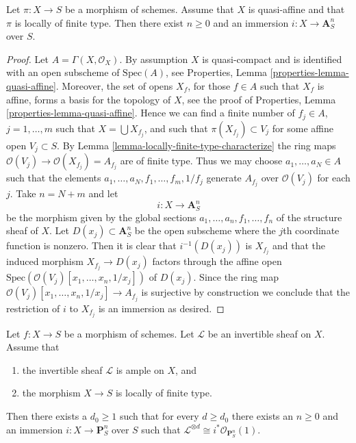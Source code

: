 \begin{lemma}
\label{lemma-quasi-affine-finite-type-over-S}
Let $\pi : X \to S$ be a morphism of schemes.
Assume that $X$ is quasi-affine and that $\pi$ is locally of finite type.
Then there exist $n \geq 0$ and an immersion $i : X \to \mathbf{A}^n_S$
over $S$.
\end{lemma}

\begin{proof}
Let $A = \Gamma(X, \mathcal{O}_X)$. By assumption $X$ is quasi-compact
and is identified with an open subscheme of $\text{Spec}(A)$, see
Properties, Lemma \ref{properties-lemma-quasi-affine}.
Moreover, the set of opens $X_f$, for those $f \in A$ such that $X_f$ is
affine, forms a basis for the topology of $X$, see the proof of
Properties, Lemma \ref{properties-lemma-quasi-affine}.
Hence we can find a finite number of $f_j \in A$, $j = 1, \ldots, m$ such that
$X = \bigcup X_{f_j}$, and such that $\pi(X_{f_j}) \subset V_j$ for
some affine open $V_j \subset S$. By
Lemma \ref{lemma-locally-finite-type-characterize}
the ring maps $\mathcal{O}(V_j) \to \mathcal{O}(X_{f_j}) = A_{f_j}$
are of finite type. Thus we may choose $a_1, \ldots, a_N \in A$ such that
the elements $a_1, \ldots, a_N, f_1, \ldots, f_m, 1/f_j$ generate
$A_{f_j}$ over $\mathcal{O}(V_j)$ for each $j$. Take $n = N + m$ and
let
$$
i : X \longrightarrow \mathbf{A}^n_S
$$
be the morphism given by the global sections
$a_1, \ldots, a_n, f_1, \ldots, f_n$ of the structure sheaf of $X$.
Let $D(x_j) \subset \mathbf{A}^n_S$ be the open subscheme where the
$j$th coordinate function is nonzero.
Then it is clear that $i^{-1}(D(x_j))$ is $X_{f_j}$ and that
the induced morphism $X_{f_j} \to D(x_j)$ factors through the affine
open $\text{Spec}(\mathcal{O}(V_j)[x_1, \ldots, x_n, 1/x_j])$
of $D(x_j)$. Since the ring map
$\mathcal{O}(V_j)[x_1, \ldots, x_n, 1/x_j] \to A_{f_j}$ is
surjective by construction we conclude that the restriction of $i$
to $X_{f_j}$ is an immersion as desired.
\end{proof}

\begin{lemma}
\label{lemma-quasi-projective-finite-type-over-S}
Let $f : X \to S$ be a morphism of schemes.
Let $\mathcal{L}$ be an invertible sheaf on $X$.
Assume that
\begin{enumerate}
\item the invertible sheaf $\mathcal{L}$ is ample on $X$, and
\item the morphism $X \to S$ is locally of finite type.
\end{enumerate}
Then there exists a $d_0 \geq 1$ such that for every $d \geq d_0$
there exists an $n \geq 0$ and an immersion
$i : X \to \mathbf{P}^n_S$ over $S$ such that
$\mathcal{L}^{\otimes d} \cong i^*\mathcal{O}_{\mathbf{P}^n_S}(1)$.
\end{lemma}

